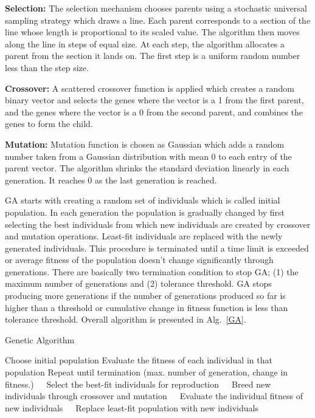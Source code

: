\documentclass[number,1p,12pt]{elsarticle}
\begin{document}
{\bf Selection:} The selection mechanism chooses parents using a stochastic universal sampling strategy which draws a line. Each parent corresponds to a section of the line whose length is proportional to its scaled value. The algorithm then moves along the line in steps of equal size. At each step, the algorithm allocates a parent from the section it lands on. The first step is a uniform random number less than the step size.

{\bf Crossover:} A scattered crossover function is applied which creates a random binary vector and selects the genes where the vector is a 1 from the first parent, and the genes where the vector is a 0 from the second parent, and combines the genes to form the child. 

{\bf Mutation:} Mutation function is chosen as Gaussian which adds a random number taken from a Gaussian distribution with mean 0 to each entry of the parent vector. The algorithm shrinks the standard deviation linearly in each generation. It reaches 0 as the last generation is reached. 

GA starts with creating a random set of individuals which is called initial population. In each generation the population is gradually changed by first selecting the best individuals from which new individuals are created by crossover and mutation operations. Least-fit individuals are replaced with the newly generated individuals. This procedure is terminated until a time limit is exceeded or average fitness of the population doesn't change significantly through generations. There are basically two termination condition to stop GA; (1) the maximum number of generations and (2) tolerance threshold. GA stops producing more generations if the number of generations produced so far is higher than a threshold or cumulative change in fitness function is less than tolerance threshold.  Overall algorithm is presented in Alg.~\ref{GA}.


\begin{algorithm}
\caption{Genetic Algorithm}\label{GA}
\begin{algorithmic}[1]
\State Choose initial population 
\State Evaluate the fitness of each individual in that population
\State Repeat until termination (max. number of generation, change in fitness.)
\State $\hspace{10pt}$ Select the best-fit individuals for reproduction
\State $\hspace{10pt}$ Breed new individuals through crossover and mutation
\State $\hspace{10pt}$ Evaluate the individual fitness of new individuals
\State $\hspace{10pt}$ Replace least-fit population with new individuals
\EndProcedure
\end{algorithmic}
\end{algorithm}
\end{document}

